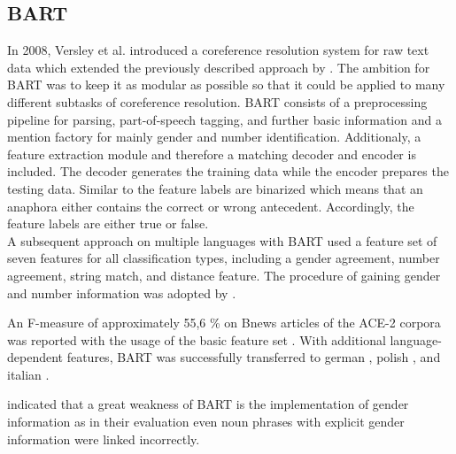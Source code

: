 \subsection{BART}
\nocite{versley2008bart}
In 2008, Versley et al. introduced a coreference resolution system for raw text data which extended the previously described approach by \cite{soon2001machine}. The ambition for BART was to keep it as modular as possible so that it could be applied to many different subtasks of coreference resolution. BART consists of a preprocessing pipeline for parsing, part-of-speech tagging, and further basic information and a mention factory for mainly gender and number identification. Additionaly, a feature extraction module and therefore a matching decoder and encoder is included. The decoder generates the training data while the encoder prepares the testing data. Similar to \citep{soon2001machine} the feature labels are binarized which means that an anaphora either contains the correct or wrong antecedent. Accordingly, the feature labels are either true or false. \\
A subsequent approach on multiple languages with BART \citep{broscheit2010bart} used a feature set of seven features for all classification types, including a gender agreement, number agreement, string match, and distance feature. The procedure of gaining gender and number information was adopted by \cite{soon2001machine}. 

An F-measure of approximately 55,6 \% on Bnews articles of the ACE-2 corpora was reported with the usage of the basic feature set \citep{versley2008bart}. 
With additional language-dependent features, BART was successfully transferred to german \citep{broscheit2010extending}, polish \citep{kopec2012creating}, and italian \citep{poesio2010creating}.

\citep{reiteretal:2011b} indicated that a great weakness of BART is the implementation of gender information as in their evaluation even noun phrases with explicit gender information were linked incorrectly.

